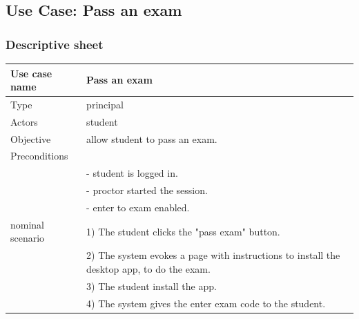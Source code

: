 \documentclass[]{uc2pfecaneva}
\begin{document}
    \begin{table}[h]
        \raggedright\subsection{Use Case: Pass an exam}
        \subsubsection{Descriptive sheet}
        \centering
        \begin{tabularx}{\textwidth}{|l|X|}
            \hline
            Use case name         & Pass an exam                                                                           \\ \hline
            Type                  & principal                                                                                         \\ \hline
            Actors                & student                                                                                           \\ \hline
            Objective             & allow student to pass an exam.                                                                    \\ \hline
            Preconditions         &                                                                                                   \\
            & - student is logged in.                                                                           \\
            & - proctor started the session.                                                                    \\
            & - enter to exam enabled.                                                                          \\ \hline
            nominal scenario
            & 1) The student clicks the "pass exam" button.                                                     \\
            & 2) The system evokes a page with instructions to install the desktop app, to do the exam.         \\
            & 3) The student install the app.                                                                   \\
            & 4) The system gives the enter exam code to the student.                                           \\

\end{tabularx}
\end{table}
\end{document}
